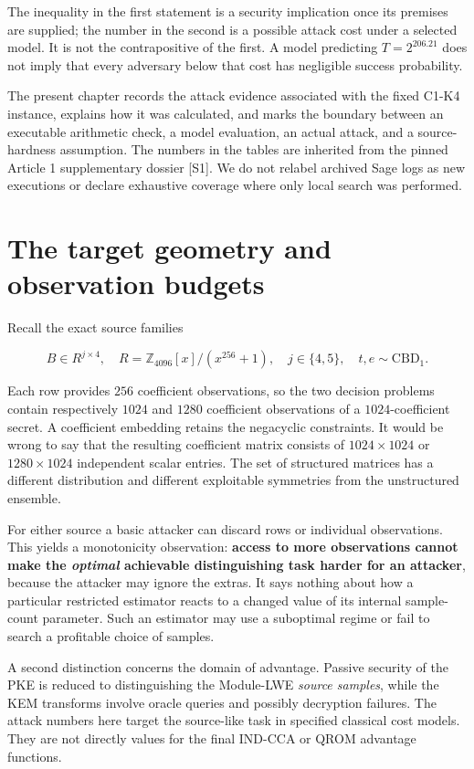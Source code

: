 \documentclass[
  11pt,
  a4paper,
  oneside]{report}
\begin{document}
The inequality in the first statement is a security implication once its
premises are supplied; the number in the second is a possible attack
cost under a selected model. It is not the contrapositive of the first.
A model predicting \(T=2^{206.21}\) does not imply that every adversary
below that cost has negligible success probability.

The present chapter records the attack evidence associated with the
fixed C1-K4 instance, explains how it was calculated, and marks the
boundary between an executable arithmetic check, a model evaluation, an
actual attack, and a source-hardness assumption. The numbers in the
tables are inherited from the pinned Article 1 supplementary dossier
{[}S1{]}. We do not relabel archived Sage logs as new executions or
declare exhaustive coverage where only local search was performed.

\section{The target geometry and observation
budgets}\label{the-target-geometry-and-observation-budgets}

Recall the exact source families

\[
B\in R^{j\times4},\quad
R=\mathbb Z_{4096}[x]/(x^{256}+1),\quad
j\in\{4,5\},\quad t,e\sim\mathrm{CBD}_1.
\]

Each row provides \(256\) coefficient observations, so the two decision
problems contain respectively \(1024\) and \(1280\) coefficient
observations of a \(1024\)-coefficient secret. A coefficient embedding
retains the negacyclic constraints. It would be wrong to say that the
resulting coefficient matrix consists of \(1024\times1024\) or
\(1280\times1024\) independent scalar entries. The set of structured
matrices has a different distribution and different exploitable
symmetries from the unstructured ensemble.

For either source a basic attacker can discard rows or individual
observations. This yields a monotonicity observation: \textbf{access to
more observations cannot make the \emph{optimal} achievable
distinguishing task harder for an attacker}, because the attacker may
ignore the extras. It says nothing about how a particular restricted
estimator reacts to a changed value of its internal sample-count
parameter. Such an estimator may use a suboptimal regime or fail to
search a profitable choice of samples.

A second distinction concerns the domain of advantage. Passive security
of the PKE is reduced to distinguishing the Module-LWE \emph{source
samples}, while the KEM transforms involve oracle queries and possibly
decryption failures. The attack numbers here target the source-like task
in specified classical cost models. They are not directly values for the
final IND-CCA or QROM advantage functions.
\end{document}
